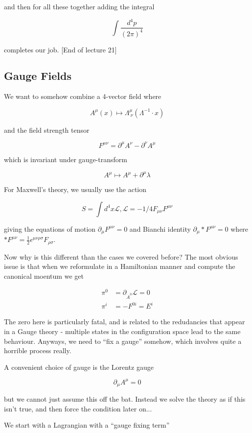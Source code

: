 \documentclass{article}
\theoremstyle{definition}
\begin{document}
and then for all these together adding the integral

$$ \int \frac{d^4p}{(2\pi)^4} $$

completes our job. [End of lecture 21]

\subsection{Gauge Fields}

We want to somehow combine a 4-vector field where

$$ A^\mu(x) \mapsto \Lambda^\mu_{\ \nu}(\Lambda^{-1} \cdot x) $$

and the field strength tensor

$$ F^{\mu \nu} = \partial^\mu A^\nu - \partial^\nu A^\mu $$

which is invariant under gauge-transform

$$ A^\mu \mapsto A^\mu + \partial^\mu \lambda $$

For Maxwell's theory, we usually use the action

$$ S = \int d^4 x \mathcal{L}, \mathcal{L} = -1/4 F_{\mu \nu} F^{\mu \nu} $$

giving the equations of motion $\partial_\mu F^{\mu \nu} = 0$ and Bianchi
identity $\partial_\mu *F^{\mu \nu} = 0$ where $*F^{\mu \nu} = \frac{1}{2}
\epsilon^{\mu \nu \rho \sigma} F_{\rho \sigma}$. 

Now why is this different than the cases we covered before? The most obvious
issue is that when we reformulate in a Hamiltonian manner and compute the
canonical moentum we get

\begin{align*}
\pi^0 &= \partial_{\dot{A}^0} \mathcal{L} = 0 \\
\pi^i &= -F^{0i} = E^i
\end{align*}

The zero here is particularly fatal, and is related to the redudancies that
appear in a Gauge theory - multiple states in the configuration space lead to
the same behaviour. Anyways, we need to ``fix a gauge'' somehow, which involves
quite a horrible process really. 

A convenient choice of gauge is the Lorentz gauge

$$ \partial_\mu A^\mu = 0 $$

but we cannot just assume this off the bat. Instead we solve the theory as if
this isn't true, and then force the condition later on...

We start with a Lagrangian with a ``gauge fixing term''
\end{document}
